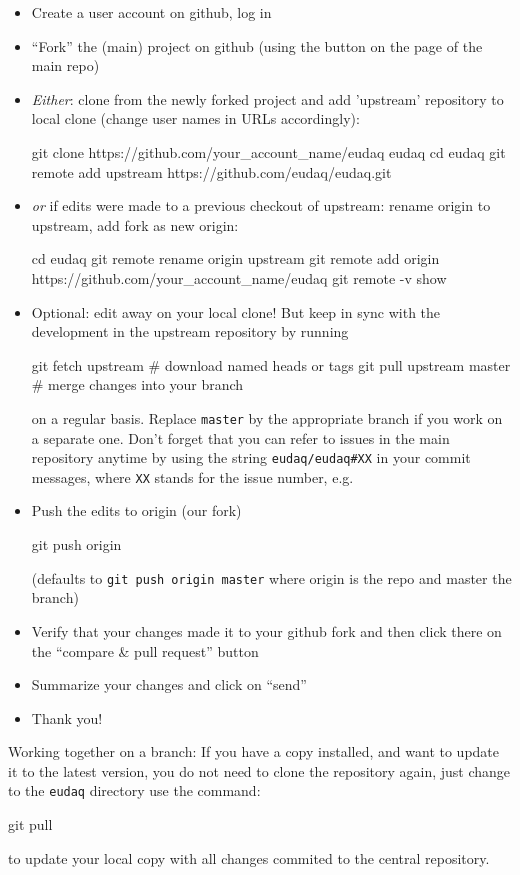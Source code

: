 \begin{itemize}
\item Create a user account on github, log in
\item ``Fork'' the (main) project on github (using the button on the page of the main repo)
\item \emph{Either}: clone from the newly forked project and add
  'upstream' repository to local clone (change user names in URLs
  accordingly):
  \begin{listing}[mybash]
git clone https://github.com/your_account_name/eudaq eudaq
cd eudaq
git remote add upstream https://github.com/eudaq/eudaq.git
\end{listing}
\item \emph{or} if edits were made to a previous checkout of upstream: rename origin to upstream, add fork as new origin:

  \begin{listing}[mybash]
cd eudaq
git remote rename origin upstream
git remote add origin https://github.com/your_account_name/eudaq
git remote -v show
\end{listing}
\item Optional: edit away on your local clone! But keep in sync with
  the development in the upstream repository by running
  \begin{listing}
git fetch upstream        # download named heads or tags
git pull upstream master  # merge changes into your branch
\end{listing}
on a regular basis. Replace \texttt{master} by the appropriate branch if you work on a separate one.
Don't forget that you can refer to issues in the main repository anytime by using the string \texttt{eudaq/eudaq\#XX} in your commit messages, where \texttt{XX} stands for the issue number, e.g.
\item Push the edits to origin (our fork)
  \begin{listing}[mybash]
git push origin
\end{listing}
(defaults to \texttt{git push origin master} where origin is the repo and master the branch)
\item Verify that your changes made it to your github fork and then click there on the ``compare \& pull request'' button
\item Summarize your changes and click on ``send''
\item Thank you!
\end{itemize}


Working together on a branch:
If you have a copy installed, and want to update it to the
latest version, you do not need to clone the repository again, just change to the \texttt{eudaq} directory use the command:
\begin{listing}[mybash]
git pull
\end{listing}
to update your local copy with all changes commited to the central repository.%

